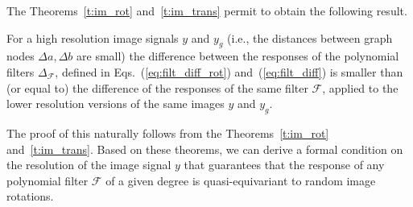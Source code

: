 \documentclass[10pt,journal,compsoc]{IEEEtran}
\begin{document}
		The Theorems~\ref{t:im_rot} and~\ref{t:im_trans} permit to obtain the following result.
	\begin{lemma}
		For a high resolution image signals $y$ and $y_g$ (i.e., the distances between graph nodes $\Delta a, \Delta b$ are small) the difference between the responses of the polynomial filters $\Delta_\mathcal{F}$, defined in Eqs.~(\ref{eq:filt_diff_rot}) and~(\ref{eq:filt_diff}) is smaller than (or equal to) the difference of the responses of the same filter $\mathcal{F}$, applied to the lower resolution versions of the same images $y$ and $y_g$. %
	\end{lemma}
	The proof of this naturally follows from the Theorems~\ref{t:im_rot} and~\ref{t:im_trans}. Based on these theorems, we can derive a formal condition on the resolution of the image signal $y$ that guarantees that the response of any polynomial filter $\mathcal{F}$ of a given degree is quasi-equivariant to random image rotations.
\end{document}
